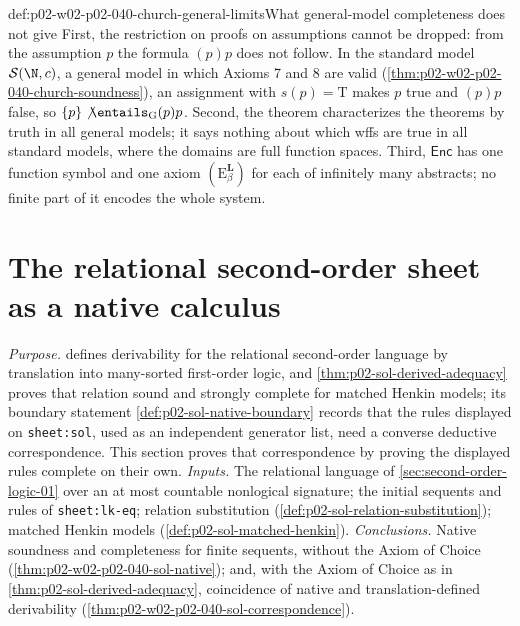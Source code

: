 \begin{hbwarning}{def:p02-w02-p02-040-church-general-limits}{What general-model completeness does not give}
First, the restriction on proofs on assumptions cannot be dropped: from the
assumption \(p\) the formula \((p)p\) does not follow.  In the standard model
\(\mathcal S(\N,c)\), a general model in which Axioms 7 and 8 are valid
(\cref{thm:p02-w02-p02-040-church-soundness}), an assignment with
\(s(p)=\mathrm T\) makes \(p\) true and \((p)p\) false, so
\(\{p\}\not\entails_{\mathrm G}(p)p\).  Second, the theorem characterizes the
theorems by truth in all general models; it says nothing about which wffs
are true in all standard models, where the domains are full function spaces.
Third, \(\mathsf{Enc}\) has one function symbol and one axiom
\((\mathrm E_\beta^{\mathbf L})\) for each of infinitely many abstracts; no
finite part of it encodes the whole system.
\end{hbwarning}

\section{The relational second-order sheet as a native calculus}
\label{sec:p02-w02-p02-040-sol-native}

\emph{Purpose.}   defines derivability for
the relational second-order language by translation into many-sorted
first-order logic, and \cref{thm:p02-sol-derived-adequacy} proves that
relation sound and strongly complete for matched Henkin models; its
boundary statement \cref{def:p02-sol-native-boundary} records that the
rules displayed on \texttt{sheet:sol}, used as an
independent generator list, need a converse deductive correspondence.
This section proves that correspondence by proving the displayed rules
complete on their own.
\emph{Inputs.}  The relational language of
\cref{sec:second-order-logic-01} over an at most countable nonlogical
signature; the initial sequents and rules of
\texttt{sheet:lk-eq}; relation substitution
(\cref{def:p02-sol-relation-substitution}); matched Henkin models
(\cref{def:p02-sol-matched-henkin}).
\emph{Conclusions.}  Native soundness and completeness for finite sequents,
without the Axiom of Choice
(\cref{thm:p02-w02-p02-040-sol-native}); and, with the Axiom of Choice as in
\cref{thm:p02-sol-derived-adequacy}, coincidence of native and
translation-defined derivability
(\cref{thm:p02-w02-p02-040-sol-correspondence}).

